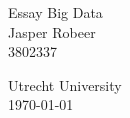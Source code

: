 \documentclass[a4paper, 11pt]{article}
\begin{document}
\begin{titlepage}
    \begin{center}
        {\Huge \textsf{Essay Big Data}} \\[\baselineskip]
        {\large Jasper Robeer \\ 3802337}
    \end{center}
    \vfill
    {\large Utrecht University} \\
    \today
\end{titlepage}

\end{document}
